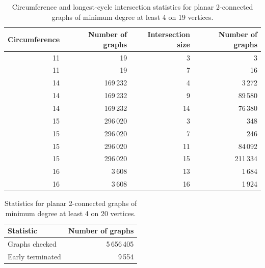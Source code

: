 \begin{table}[ht]
\centering
\caption{Circumference and longest-cycle intersection statistics for planar 2-connected graphs of minimum degree at least 4 on 19 vertices.}
\label{tab:circ-intersection-min4-n19}
\begin{tabular}{rrrr}
\toprule
Circumference & Number of graphs & Intersection size & Number of graphs \\
\midrule
11 & 19 & 3 & 3 \\
11 & 19 & 7 & 16 \\
14 & 169\,232 & 4 & 3\,272 \\
14 & 169\,232 & 9 & 89\,580 \\
14 & 169\,232 & 14 & 76\,380 \\
15 & 296\,020 & 3 & 348 \\
15 & 296\,020 & 7 & 246 \\
15 & 296\,020 & 11 & 84\,092 \\
15 & 296\,020 & 15 & 211\,334 \\
16 & 3\,608 & 13 & 1\,684 \\
16 & 3\,608 & 16 & 1\,924 \\
\bottomrule
\end{tabular}
\end{table}

\begin{table}[ht]
\centering
\caption{Statistics for planar 2-connected graphs of minimum degree at least 4 on 20 vertices.}
\label{tab:summary-min4-n20}
\begin{tabular}{lr}
\toprule
Statistic & Number of graphs \\
\midrule
Graphs checked & 5\,656\,405 \\
Early terminated & 9\,554 \\
\bottomrule
\end{tabular}
\end{table}


